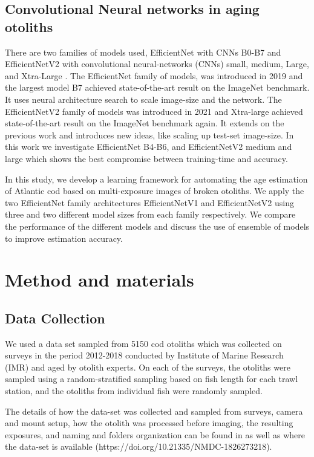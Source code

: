 \documentclass[10pt,letterpaper]{article}
\begin{document}
\subsection*{Convolutional Neural networks in aging otoliths}
There are two families of models used, EfficientNet with CNNs B0-B7 \citep{DBLP:journals/corr/abs-1905-11946}  and EfficientNetV2 with 
convolutional neural-networks (CNNs)
small, medium, Large, and Xtra-Large \citep{DBLP:journals/corr/abs-1905-11946}. The EfficientNet family of models, was introduced in 2019 and the largest model B7 achieved state-of-the-art result on the ImageNet \citep{deng2009imagenet} benchmark. It uses neural architecture search to scale image-size and the network. The EfficientNetV2 family of models was introduced in 2021 and Xtra-large achieved state-of-the-art result on the ImageNet benchmark again. It extends on the previous work and introduces new ideas, like scaling up test-set image-size.
In this work we investigate EfficientNet B4-B6, and EfficientNetV2 medium and large which shows the best compromise between training-time
and accuracy.

In this study, we develop a learning framework for automating the age estimation of Atlantic cod based on multi-exposure images of broken otoliths. We apply the two EfficientNet family architectures EfficientNetV1 and EfficientNetV2 using three and two different model sizes from each family respectively. We compare the performance of the different models and discuss the use of ensemble of models to improve estimation accuracy.

\section*{Method and materials}

\subsection*{Data Collection}

We used a data set sampled from 5150 cod otoliths which was collected 
on surveys in the period 2012-2018 conducted by Institute of Marine Research (IMR) and aged by otolith experts. On each of the surveys, the otoliths were sampled using a random-stratified sampling based on fish length for each trawl station, and the otoliths from individual fish were randomly sampled.

The details of how the data-set was collected and sampled from surveys, camera and mount 
setup, how the otolith was processed before imaging, the resulting exposures, and naming and
folders organization can be found in \citep{codOtolithsMyers} as well as where the data-set is available (https://doi.org/10.21335/NMDC-1826273218).
\end{document}
